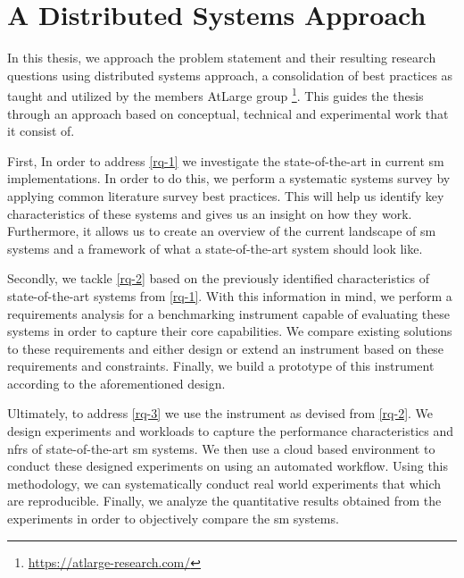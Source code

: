 \section{A Distributed Systems Approach}
\label{sec:approach}


In this thesis, we approach the problem statement and their resulting research questions using distributed systems approach, a consolidation of best practices as taught and utilized by the members AtLarge group \footnote{\url{https://atlarge-research.com/}}. This guides the thesis through an approach based on conceptual, technical and experimental work that it consist of.

First, In order to address \ref{rq-1} we investigate the state-of-the-art in current \gls{sm} implementations. In order to do this, we perform a systematic systems survey by applying common literature survey best practices. This will help us identify key characteristics of these systems and gives us an insight on how they work. Furthermore, it allows us to create an overview of the current landscape of \gls{sm} systems and a framework of what a state-of-the-art system should look like. 

Secondly, we tackle \ref{rq-2} based on the previously identified characteristics of state-of-the-art systems from \ref{rq-1}. With this information in mind, we perform a requirements analysis for a benchmarking instrument capable of evaluating these systems in order to capture their core capabilities. We compare existing solutions to these requirements and either design or extend an instrument based on these requirements and constraints. Finally, we build a prototype of this instrument according to the aforementioned design.

Ultimately, to address \ref{rq-3} we use the instrument as devised from \ref{rq-2}. We design experiments and workloads to capture the performance characteristics and \glspl{nfr} of state-of-the-art \gls{sm} systems. We then use a cloud based environment to conduct these designed experiments on using an automated workflow. Using this methodology, we can systematically conduct real world experiments that which are reproducible. Finally, we analyze the quantitative results obtained from the experiments in order to objectively compare the \gls{sm} systems.